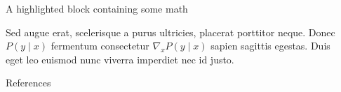 \documentclass[final]{beamer}
\newlength{\sepwidth}
\newlength{\colwidth}
\newcommand{\separatorcolumn}{\begin{column}{\sepwidth}\end{column}}
\begin{document}
\begin{frame}[t]
\begin{columns}[t]
\begin{column}{\colwidth}
\begin{exampleblock}{A highlighted block containing some math}

                    Sed augue erat, scelerisque a purus ultricies, placerat porttitor neque.
                    Donec $P(y \mid x)$ fermentum consectetur $\nabla_x P(y \mid x)$ sapien
                    sagittis egestas. Duis eget leo euismod nunc viverra imperdiet nec id
                    justo.

                \end{exampleblock}



                \begin{block}{References}

                    \nocite{*}
                    \footnotesize{}

                \end{block}

            \end{column}
            \separatorcolumn



        \end{columns}
    \end{frame}
\end{document}
